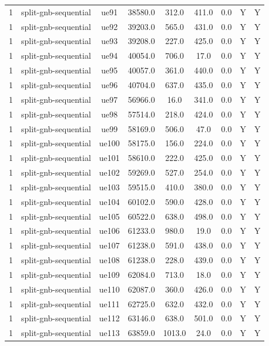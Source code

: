 \begin{table}[ht]
\begin{tabular}{|c|c|c|c|c|c|c|c|c|}
1 & split-gnb-sequential & ue91 & 38580.0 & 312.0 & 411.0 & 0.0 & Y & Y \\
1 & split-gnb-sequential & ue92 & 39203.0 & 565.0 & 431.0 & 0.0 & Y & Y \\
1 & split-gnb-sequential & ue93 & 39208.0 & 227.0 & 425.0 & 0.0 & Y & Y \\
1 & split-gnb-sequential & ue94 & 40054.0 & 706.0 & 17.0 & 0.0 & Y & Y \\
1 & split-gnb-sequential & ue95 & 40057.0 & 361.0 & 440.0 & 0.0 & Y & Y \\
1 & split-gnb-sequential & ue96 & 40704.0 & 637.0 & 435.0 & 0.0 & Y & Y \\
1 & split-gnb-sequential & ue97 & 56966.0 & 16.0 & 341.0 & 0.0 & Y & Y \\
1 & split-gnb-sequential & ue98 & 57514.0 & 218.0 & 424.0 & 0.0 & Y & Y \\
1 & split-gnb-sequential & ue99 & 58169.0 & 506.0 & 47.0 & 0.0 & Y & Y \\
1 & split-gnb-sequential & ue100 & 58175.0 & 156.0 & 224.0 & 0.0 & Y & Y \\
1 & split-gnb-sequential & ue101 & 58610.0 & 222.0 & 425.0 & 0.0 & Y & Y \\
1 & split-gnb-sequential & ue102 & 59269.0 & 527.0 & 254.0 & 0.0 & Y & Y \\
1 & split-gnb-sequential & ue103 & 59515.0 & 410.0 & 380.0 & 0.0 & Y & Y \\
1 & split-gnb-sequential & ue104 & 60102.0 & 590.0 & 428.0 & 0.0 & Y & Y \\
1 & split-gnb-sequential & ue105 & 60522.0 & 638.0 & 498.0 & 0.0 & Y & Y \\
1 & split-gnb-sequential & ue106 & 61233.0 & 980.0 & 19.0 & 0.0 & Y & Y \\
1 & split-gnb-sequential & ue107 & 61238.0 & 591.0 & 438.0 & 0.0 & Y & Y \\
1 & split-gnb-sequential & ue108 & 61238.0 & 228.0 & 439.0 & 0.0 & Y & Y \\
1 & split-gnb-sequential & ue109 & 62084.0 & 713.0 & 18.0 & 0.0 & Y & Y \\
1 & split-gnb-sequential & ue110 & 62087.0 & 360.0 & 426.0 & 0.0 & Y & Y \\
1 & split-gnb-sequential & ue111 & 62725.0 & 632.0 & 432.0 & 0.0 & Y & Y \\
1 & split-gnb-sequential & ue112 & 63146.0 & 638.0 & 501.0 & 0.0 & Y & Y \\
1 & split-gnb-sequential & ue113 & 63859.0 & 1013.0 & 24.0 & 0.0 & Y & Y \\

\end{tabular}
\end{table}
